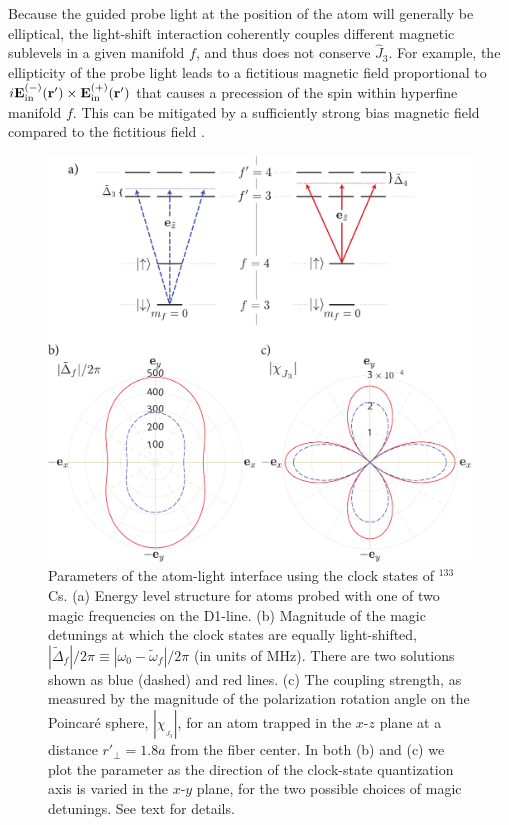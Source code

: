 \documentclass[preprint, aps,pra,onecolumn]{revtex4-1} %
\newcommand{\inp}{{\rm in}}
\newcommand{\magic}[1]{\tilde{\omega}_{#1}}
\begin{document}
Because the guided probe light at the position of the atom will generally be elliptical, the light-shift interaction coherently couples different magnetic sublevels in a given manifold $f$, and thus does not conserve $\hat{J}_3$.  For example, the ellipticity of the probe light leads to a fictitious magnetic field proportional to $i \mathbf{E}^{(-)}_{\inp}(\br') \times \mathbf{E}^{(+)}_{\inp}(\br')$ that causes a precession of the spin within hyperfine manifold $f$.  This can be mitigated by a sufficiently strong bias magnetic field compared to the fictitious field \cite{smith_continuous_2004}. 


\begin{figure}
\includegraphics[scale=0.44]{./Fig3}
\caption{Parameters of the atom-light interface using the clock states of $^{133}$Cs.  
(a) Energy level structure for atoms probed with one of two magic frequencies on the D1-line. 
(b) Magnitude of the magic detunings at which the clock states are equally light-shifted, $| \tilde{\Delta}_{f}|/2\pi \equiv | \omega_0 - \magic{f} |/2\pi$ (in units of MHz). There are two solutions shown as blue (dashed) and red lines. (c) The coupling strength, as measured by the magnitude of the polarization rotation angle on the Poincar\'{e} sphere, $|\chi_{_{ J_3}}|$, for an atom trapped in the $x$-$z$ plane at a distance $ r'\!_\perp=1.8a $ from the fiber center.  In both (b) and (c) we plot the parameter as the direction of the clock-state quantization axis is varied in the $x$-$y$ plane, for the two possible choices of magic detunings.
See text for details.}\label{Fig::CouplingStrength}
\end{figure}
\end{document}
